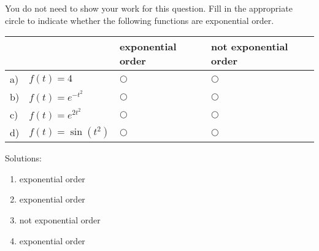\ifnum {}
\question[1] You do not need to show your work for this question. Fill in the appropriate circle to indicate whether the following functions are exponential order. 
\vspace{-0.2cm}
\setlength{\extrarowheight}{0.20cm}
\begin{center}
\hspace{-.9cm}\begin{tabular}{ p{0.20cm} p{4cm} p{3.5cm} p{4cm} }
    & & exponential order &  not exponential order  \\[2pt] \hline 
    a) & $f(t) = 4$ & $\bigcirc$  & $\bigcirc$ \\[8pt]  
    b) & $f(t) = e^{-t^2}$  & $\bigcirc$  & $\bigcirc$ \\[8pt] 
    c) & $f(t) = e^{2t^2}$  & $\bigcirc$  & $\bigcirc$ \\[8pt] 
    d) & $f(t) = \sin(t^2)$  & $\bigcirc$  & $\bigcirc$ \\[8pt] 
    \hline
\end{tabular}
\end{center}
\setlength{\extrarowheight}{0.0cm}
\ifnum {} {\color{DarkBlue} Solutions: 
\begin{enumerate}[label=(\alph*)]
    \item exponential order
    \item exponential order
    \item not exponential order
    \item exponential order
\end{enumerate}
}
\fi
\vspace{-6pt} 
\fi 


